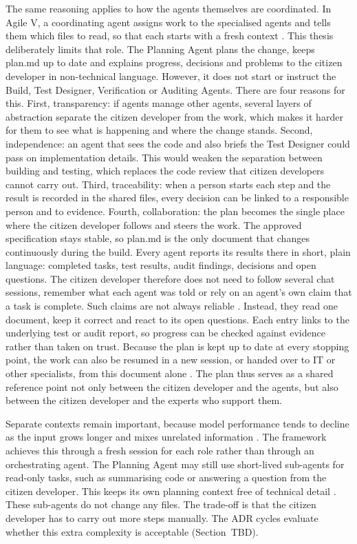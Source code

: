 \documentclass[10pt,a4paper]{article}
\begin{document}
The same reasoning applies to how the agents themselves are coordinated. In Agile V, a coordinating agent assigns work to the specialised agents and tells them which files to read, so that each starts with a fresh context \parencite{koch2026agile}. This thesis deliberately limits that role. The Planning Agent plans the change, keeps plan.md up to date and explains progress, decisions and problems to the citizen developer in non-technical language. However, it does not start or instruct the Build, Test Designer, Verification or Auditing Agents. There are four reasons for this. First, transparency: if agents manage other agents, several layers of abstraction separate the citizen developer from the work, which makes it harder for them to see what is happening and where the change stands. Second, independence: an agent that sees the code and also briefs the Test Designer could pass on implementation details. This would weaken the separation between building and testing, which replaces the code review that citizen developers cannot carry out. Third, traceability: when a person starts each step and the result is recorded in the shared files, every decision can be linked to a responsible person and to evidence. Fourth, collaboration: the plan becomes the single place where the citizen developer follows and steers the work. The approved specification stays stable, so plan.md is the only document that changes continuously during the build. Every agent reports its results there in short, plain language: completed tasks, test results, audit findings, decisions and open questions. The citizen developer therefore does not need to follow several chat sessions, remember what each agent was told or rely on an agent's own claim that a task is complete. Such claims are not always reliable \parencite{alhasan2026}. Instead, they read one document, keep it correct and react to its open questions. Each entry links to the underlying test or audit report, so progress can be checked against evidence rather than taken on trust. Because the plan is kept up to date at every stopping point, the work can also be resumed in a new session, or handed over to IT or other specialists, from this document alone \parencite{friel2025}. The plan thus serves as a shared reference point not only between the citizen developer and the agents, but also between the citizen developer and the experts who support them.

Separate contexts remain important, because model performance tends to decline as the input grows longer and mixes unrelated information \parencite{hong2025context}. The framework achieves this through a fresh session for each role rather than through an orchestrating agent. The Planning Agent may still use short-lived sub-agents for read-only tasks, such as summarising code or answering a question from the citizen developer. This keeps its own planning context free of technical detail \parencite{anthropic2025context}. These sub-agents do not change any files. The trade-off is that the citizen developer has to carry out more steps manually. The ADR cycles evaluate whether this extra complexity is acceptable (Section~TBD).
\end{document}
